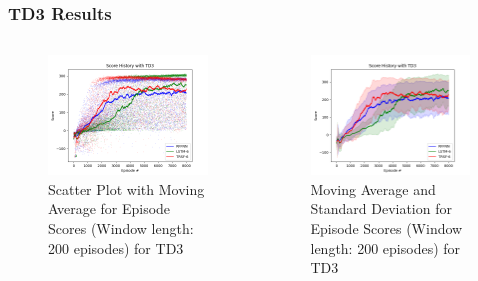 \documentclass{beamer}
\begin{document}
\begin{frame}
\frametitle{TD3 Results}
\begin{columns}[onlytextwidth]
	\begin{column}{.49\textwidth}
		\begin{figure}[!ht]
			\centering
			\includegraphics[width=0.99\textwidth]{figures/bipedal/SCT_TD3_RFFNN_LSTM-6_TRSF-6.png}
			\caption{Scatter Plot with Moving Average for Episode Scores (Window length: 200 episodes) for TD3}
			\label{fig:td3_scatter_ep_rewards}
		\end{figure}
	\end{column}
	\begin{column}{.49\textwidth}
		\begin{figure}[!ht]
			\centering
			\includegraphics[width=0.99\textwidth]{figures/bipedal/STD_TD3_RFFNN_LSTM-6_TRSF-6.png}
			\caption{Moving Average and Standard Deviation for Episode Scores (Window length: 200 episodes) for TD3}
			\label{fig:td3_std_ep_rewards}
		\end{figure} 
	\end{column}
\end{columns}
\end{frame}
\end{document}
